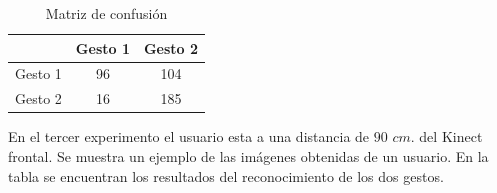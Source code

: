 \begin{table}[h!] 
\begin{center}
\begin{tabular}{ r || c | c |} 
 
        & Gesto 1 & Gesto 2 \\ \hline \hline  
Gesto 1 & 96     &  104     \\ \hline  
Gesto 2 & 16     & 185     \\   

\end{tabular}
\end{center} 
\caption{Matriz de confusión}
\end{table}


En el tercer experimento el usuario esta a una distancia de $90$ $cm.$ del Kinect frontal. Se muestra un ejemplo de las imágenes obtenidas de un usuario. En la tabla se encuentran los resultados del reconocimiento de los dos gestos.    

